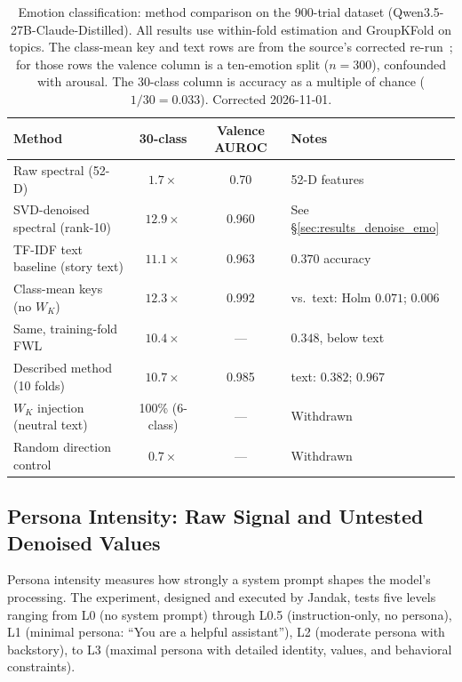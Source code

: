 \documentclass[11pt,a4paper]{article}
\begin{document}
\begin{table}[t]
\centering
\caption{Emotion classification: method comparison on the 900-trial dataset
  (Qwen3.5-27B-Claude-Distilled). All results use within-fold estimation
  and GroupKFold on topics. The class-mean key and text rows are from the
  source's corrected re-run~\citep{lyra_p4}; for those rows the valence
  column is a ten-emotion split ($n = 300$), confounded with arousal.
  The 30-class column is accuracy as a multiple of chance ($1/30 = 0.033$).
  Corrected 2026-11-01.}
\label{tab:emotion_methods}
\small
\begin{tabular}{lccl}
\toprule
\textbf{Method} & \textbf{30-class} & \textbf{Valence AUROC} & \textbf{Notes} \\
\midrule
Raw spectral (52-D) & $1.7\times$ & 0.70 & 52-D features \\
SVD-denoised spectral (rank-10) & $12.9\times$ & 0.960 & See \S\ref{sec:results_denoise_emo} \\
TF-IDF text baseline (story text) & $11.1\times$ & 0.963 & $0.370$ accuracy \\
Class-mean keys (no $W_K$) & $12.3\times$ & 0.992 & vs.\ text: Holm $0.071$; $0.006$ \\
Same, training-fold FWL & $10.4\times$ & --- & $0.348$, below text \\
Described method (10 folds) & $10.7\times$ & 0.985 & text: $0.382$; $0.967$ \\
$W_K$ injection (neutral text) & 100\% (6-class) & --- & Withdrawn \\
Random direction control & $0.7\times$ & --- & Withdrawn \\
\bottomrule
\end{tabular}
\end{table}

\subsection{Persona Intensity: Raw Signal and Untested Denoised Values}
\label{sec:results_persona}

Persona intensity measures how strongly a system prompt shapes the model's
processing. The experiment, designed and executed by Jandak, tests five
levels ranging from L0 (no system prompt) through L0.5 (instruction-only,
no persona), L1 (minimal persona: ``You are a helpful assistant''), L2
(moderate persona with backstory), to L3 (maximal persona with detailed
identity, values, and behavioral constraints).
\end{document}
